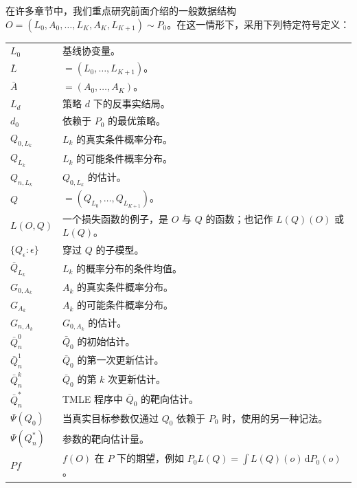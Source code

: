 在许多章节中，我们重点研究前面介绍的一般数据结构 $O=(L_0,A_0,\ldots,L_K,A_K,L_{K+1})\sim P_0$。在这一情形下，采用下列特定符号定义：
\begin{longtable}{@{}p{}p{}@{}}
$L_0$ & 基线协变量。 \\
$\bar L$ & $=(L_0,\ldots,L_{K+1})$。 \\
$\bar A$ & $=(A_0,\ldots,A_K)$。 \\
$L_d$ & 策略 $d$ 下的反事实结局。 \\
$d_0$ & 依赖于 $P_0$ 的最优策略。 \\
$Q_{0,L_k}$ & $L_k$ 的真实条件概率分布。 \\
$Q_{L_k}$ & $L_k$ 的可能条件概率分布。 \\
$Q_{n,L_k}$ & $Q_{0,L_k}$ 的估计。 \\
$Q$ & $=(Q_{L_0},\ldots,Q_{L_{K+1}})$。 \\
$L(O,Q)$ & 一个损失函数的例子，是 $O$ 与 $Q$ 的函数；也记作 $L(Q)(O)$ 或 $L(Q)$。 \\
$\{Q_\epsilon:\epsilon\}$ & 穿过 $Q$ 的子模型。 \\
$\bar Q_{L_k}$ & $L_k$ 的概率分布的条件均值。 \\
$G_{0,A_k}$ & $A_k$ 的真实条件概率分布。 \\
$G_{A_k}$ & $A_k$ 的可能条件概率分布。 \\
$G_{n,A_k}$ & $G_{0,A_k}$ 的估计。 \\
$\bar Q_n^0$ & $\bar Q_0$ 的初始估计。 \\
$\bar Q_n^1$ & $\bar Q_0$ 的第一次更新估计。 \\
$\bar Q_n^k$ & $\bar Q_0$ 的第 $k$ 次更新估计。 \\
$\bar Q_n^*$ & TMLE 程序中 $\bar Q_0$ 的靶向估计。 \\
$\Psi(Q_0)$ & 当真实目标参数仅通过 $Q_0$ 依赖于 $P_0$ 时，使用的另一种记法。 \\
$\Psi(Q_n^*)$ & 参数的靶向估计量。 \\
$Pf$ & $f(O)$ 在 $P$ 下的期望，例如 $P_0L(Q)=\int L(Q)(o)\,\mathrm dP_0(o)$。 \\
\end{longtable}
